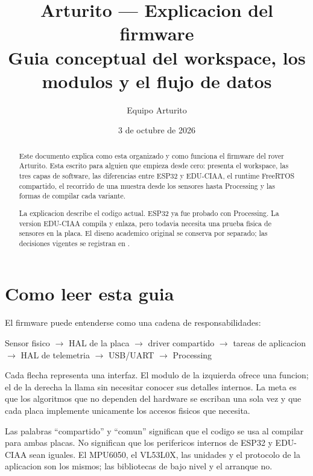 \documentclass[11pt,a4paper]{article}
\title{Arturito --- Explicacion del firmware\\
       \large Guia conceptual del workspace, los modulos y el flujo de datos}
\author{Equipo Arturito}
\date{3 de octubre de 2026}
\newcommand{\ruta}[1]{\path{#1}}
\begin{document}
\maketitle

\begin{abstract}
Este documento explica como esta organizado y como funciona el firmware del
rover Arturito. Esta escrito para alguien que empieza desde cero: presenta el
workspace, las tres capas de software, las diferencias entre ESP32 y EDU-CIAA,
el runtime FreeRTOS compartido, el recorrido de una muestra desde los sensores
hasta Processing y las formas de compilar cada variante.

La explicacion describe el codigo actual. ESP32 ya fue probado con Processing.
La version EDU-CIAA compila y enlaza, pero todavia necesita una prueba fisica de
sensores en la placa. El diseno academico original se conserva por separado;
las decisiones vigentes se registran en \ruta{informe_avance.tex}.
\end{abstract}

\tableofcontents
\newpage

\section{Como leer esta guia}

El firmware puede entenderse como una cadena de responsabilidades:

\begin{center}
Sensor fisico $\rightarrow$ HAL de la placa $\rightarrow$ driver compartido
$\rightarrow$ tareas de aplicacion $\rightarrow$ HAL de telemetria
$\rightarrow$ USB/UART $\rightarrow$ Processing
\end{center}

Cada flecha representa una interfaz. El modulo de la izquierda ofrece una
funcion; el de la derecha la llama sin necesitar conocer sus detalles internos.
La meta es que los algoritmos que no dependen del hardware se escriban una sola
vez y que cada placa implemente unicamente los accesos fisicos que necesita.

Las palabras ``compartido'' y ``comun'' significan que el codigo se usa al
compilar para ambas placas. No significan que los perifericos internos de ESP32
y EDU-CIAA sean iguales. El MPU6050, el VL53L0X, las unidades y el protocolo de
la aplicacion son los mismos; las bibliotecas de bajo nivel y el arranque no.
\end{document}
